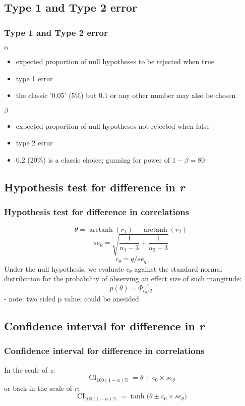 \documentclass{beamer}
\DeclareMathOperator\arctanh{arctanh}
\DeclareMathOperator\ci{CI}
\begin{document}
  \subsection{Type 1 and Type 2 error}
  \begin{frame}
    \frametitle{Type 1 and Type 2 error }  
    \(\alpha\)
    \begin{itemize}
      \item expected proportion of null hypotheses to be rejected when true 
      \item type 1 error
      \item the classic '0.05' (5\%)\; but 0.1 or any other number may also be chosen 
    \end{itemize}
    
    \(\beta\)
    \begin{itemize}
      \item expected proportion of null hypotheses not rejected when false 
      \item type 2 error
      \item 0.2 (20\%) is a classic choice; gunning for power of \(1 - \beta = 80\)
    \end{itemize}
  \end{frame} 

  \subsection{Hypothesis test for difference in \it{r}}  
  \begin{frame}
    \frametitle{Hypothesis test for difference in correlations  }
    \[\theta     = \arctanh(r_1) - \arctanh(r_2)          \]
    \[se_\theta  = \sqrt{\frac{1}{n_1-3}+\frac{1}{n_2-3}} \]
    \[c_\theta   = q / se_q                               \] 
    Under the null hypothesis, we evaluate \(c_\theta\) against the standard normal distribution for the probability of observing an effect size of such mangitude:
    \[p(\theta)  =  \Phi_{c_\theta/2}^{-1}                \]
      - note: two sided p value; could be onesided
  \end{frame}   

  \subsection{Confidence interval for difference in \it{r}}   
  \begin{frame}
    \frametitle{Confidence interval for difference in correlations}  
    In the scale of \(z\):
    \[\ci_{100(1-\alpha)\%} =\theta \pm c_0 \times se_\theta \] 
    or back in the scale of \(r\):
    \[\ci_{100(1-\alpha)\%} =\tanh \bigg( \theta \pm c_0 \times se_\theta \bigg) \] 
  \end{frame}    
  
\end{document}
